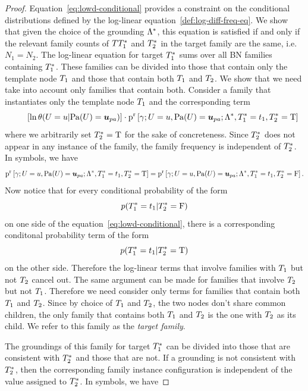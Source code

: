 \documentclass[runningheads,a4paper]{llncs}
\begin{document}
\begin{proof}
Equation~\eqref{eq:lowd-conditional} provides a constraint on the conditional distributions defined by the log-linear equation~\eqref{def:log-diff-freq-eq}. We show that given the choice of the grounding $\Lambda^{*}\hspace{0.0ex}$, this equation is satisfied if and only if the relevant family counts of $TT_{1}^{*}\hspace{0.0ex}$ and $T_{2}^{*}\hspace{0.0ex}$ in the target family are the same, i.e. $N_{1} = N_{2}$. The log-linear equation for target $T_{1}^{*}\hspace{0.0ex}$ sums over all BN families containing $T_{1}^{*}\hspace{0.0ex}$. These families can be divided into those that contain only the template node $T_{1}$ and those that contain both $T_{1}$ and $T_{2}$. We show that we need take into account only families that contain both. Consider a family that instantiates only the template node $T_{1}$ and the corresponding term
$$
\qquad \left[ \ln \cprob{\UT = \UV}{\Pa{\UT} = \Prange{\UT}} \right]  \cdot   \Relfreq{\Appendterm{\grounding;\UT  = \UV} {\Pa{\UT} = \Prange{\UT}}} {\QC,\FG{\TT_{1}} = \TV_{1},\FG{\TT_{2}} = \true}
$$
where we arbitrarily set $T_{2}^{*}\hspace{0.0ex} = \mathrm{T}$ for the sake of concreteness. Since $T_{2}^{*}\hspace{0.0ex}$ does not appear in any instance of the family, the family frequency is independent of $T_{2}^{*}\hspace{0.0ex}$. In symbols, we have
%
$$
 \Relfreq{\Appendterm{\grounding;\UT  = \UV} {\Pa{\UT} = \Prange{\UT}}} {\QC,\FG{\TT_{1}} = \TV_{1},\FG{\TT_{2}} = \true} = \Relfreq{\Appendterm{\grounding;\UT  = \UV} {\Pa{\UT} = \Prange{\UT}}} {\QC,\FG{\TT_{1}} = \TV_{1},\FG{\TT_{2}} = \false}.
$$
Now notice that for every conditional probability of the form $$p(T_{1}^{*}\hspace{0.0ex}=t_{1}|T_{2}^{*}\hspace{0.0ex}=\mathrm{F})$$ on one side of the equation~\ref{eq:lowd-conditional}, there is a corresponding conditonal probability term of the form $$p(T_{1}^{*}\hspace{0.0ex}=t_{1}|T_{2}^{*}\hspace{0.0ex}=\mathrm{T})$$ on the other side. Therefore the log-linear terms that involve families with $T_{1}$ but not $T_{2}$ cancel out. The same argument can be made for families that involve $T_{2}$ but not $T_{1}$. Therefore we need consider only terms for families that contain both $T_{1}$ and $T_{2}$. Since by choice of $T_{1}$ and $T_{2}$, the two nodes don't share common children, the only family that contains both $T_{1}$ and $T_{2}$ is the one with $T_{2}$ as its child. We refer to this family as the {\em target family}. 

The groundings of this family for target $T_{1}^{*}\hspace{0.0ex}$ can be divided into those that are consistent with $T_{2}^{*}\hspace{0.0ex}$ and those that are not. If a grounding is not consistent with $T_{2}^{*}\hspace{0.0ex}$, then the corresponding family instance configuration is independent of the value assigned to $T_{2}^{*}\hspace{0.0ex}$. In symbols, we have


\end{proof}
\end{document}
